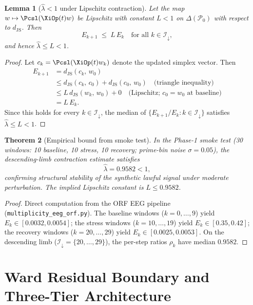 \documentclass[12pt,a4paper]{article}
\theoremstyle{plain}
\newtheorem{theorem}{Theorem}[section]
\newtheorem{lemma}[theorem]{Lemma}
\theoremstyle{definition}
\newcommand{\dJS}{d_{\mathrm{JS}}}
\begin{document}
\begin{lemma}[$\hat\lambda < 1$ under Lipschitz contraction]
  \label{lem:lambda}
  Let the map $w\mapsto\Pcsl(\XiOp(t)w)$ be Lipschitz with constant
  $L<1$ on $\Delta(\mathcal{P}_0)$ with respect to $\dJS$.  Then
  \[
    E_{k+1} \;\le\; L\,E_k \quad\text{for all }k\in\mathcal{I}_\downarrow,
  \]
  and hence $\hat\lambda \le L < 1$.
\end{lemma}

\begin{proof}
  Let $c_k = \Pcsl(\XiOp(t)w_k)$ denote the updated simplex vector.  Then
  \begin{align*}
    E_{k+1} &= \dJS(c_k,\, w_0)\\
            &\le \dJS(c_k,\, c_0) + \dJS(c_0,\, w_0)
             \quad\text{(triangle inequality)}\\
            &\le L\,\dJS(w_k,\, w_0) + 0
             \quad\text{(Lipschitz; $c_0 = w_0$ at baseline)}\\
            &= L\,E_k.
  \end{align*}
  Since this holds for every $k\in\mathcal{I}_\downarrow$, the median of
  $\{E_{k+1}/E_k : k\in\mathcal{I}_\downarrow\}$ satisfies
  $\hat\lambda\le L < 1$.
\end{proof}

\begin{theorem}[Empirical bound from smoke test]
  \label{thm:smoke}
  In the Phase-1 smoke test (30 windows: 10 baseline, 10 stress, 10
  recovery; prime-bin noise $\sigma = 0.05$), the descending-limb
  contraction estimate satisfies
  \[
    \hat\lambda = 0.9582 < 1,
  \]
  confirming structural stability of the synthetic lawful signal under
  moderate perturbation.  The implied Lipschitz constant is $L\le 0.9582$.
\end{theorem}

\begin{proof}
  Direct computation from the ORF EEG pipeline (\texttt{multiplicity\_eeg\_orf.py}).
  The baseline windows ($k=0,\ldots,9$) yield $E_k\in[0.0032, 0.0054]$;
  the stress windows ($k=10,\ldots,19$) yield $E_k\in[0.35, 0.42]$;
  the recovery windows ($k=20,\ldots,29$) yield $E_k\in[0.0025, 0.0053]$.
  On the descending limb ($\mathcal{I}_\downarrow = \{20,\ldots,29\}$),
  the per-step ratios $\rho_k$ have median $0.9582$.
\end{proof}

\section{Ward Residual Boundary and Three-Tier Architecture}
\label{sec:ward}
\end{document}

